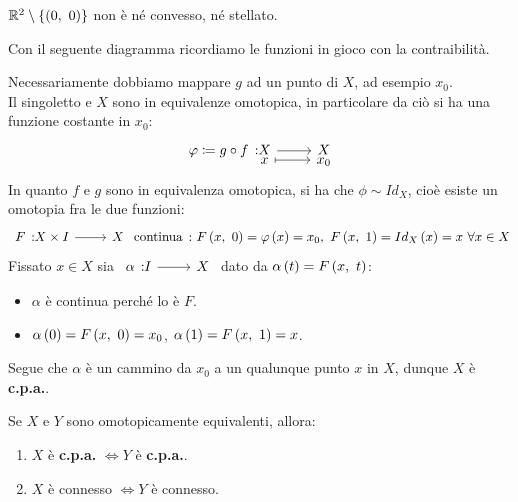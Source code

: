 \begin{example}
$\realset^2\setminus\left\{\left(0,\ 0\right)\right\}$ non è né convesso, né stellato.
\end{example}
\begin{lemming}
\end{lemming}
\begin{demonstration} Con il seguente diagramma ricordiamo le funzioni in gioco con la contraibilità.
\begin{center}
\end{center}
Necessariamente dobbiamo mappare $g$ ad un punto di $X$, ad esempio $x_0$.  \\
Il singoletto e $X$ sono in equivalenze omotopica, in particolare da ciò si ha una funzione costante in $x_0$:
\begin{equation*}
	\funztot{\phi\coloneqq g\circ f}{X}{X}{x}{x_0}
\end{equation*}
In quanto $f$ e $g$ sono in equivalenza omotopica, si ha che $\phi\sim Id_X$, cioè esiste un omotopia fra le due funzioni:
\begin{equation*}
	\funz{F}{X\times I}{X}\text{ continua}\ \colon \mvf{F}{x}{0}=\phi\left(x\right)=x_0,\ \mvf{F}{x}{1}=Id_X\left(x\right)=x\ \forall x\in X
\end{equation*}
Fissato $x\in X$ sia $\funz{\alpha}{I}{X}$ dato da $\alpha\left(t\right)=F\left(x,\ t\right)$:
\begin{itemize}
	\item $\alpha$ è continua perché lo è $F$.
	\item $\alpha\left(0\right)=F\left(x,\ 0\right)=x_0$, $\alpha\left(1\right)=F\left(x,\ 1\right)=x$.
\end{itemize}
Segue che $\alpha$ è un cammino da $x_0$ a un qualunque punto $x$ in $X$, dunque $X$ è \textbf{c.p.a.}.
\end{demonstration}
\begin{exercise}
Se $X$ e $Y$ sono omotopicamente equivalenti, allora:
\begin{enumerate}
\item $X$ è \textbf{c.p.a.} $\iff Y$ è \textbf{c.p.a.}.
\item $X$ è connesso $\iff Y$ è connesso.
\end{enumerate}
\vspace{-3mm}
\end{exercise}
